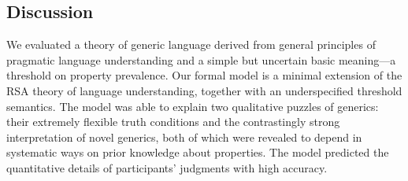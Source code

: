 \documentclass{pnastwo}
\begin{document}
\begin{article}
\section{Discussion}

We evaluated a theory of generic language derived from general principles of pragmatic language understanding and a simple but uncertain basic meaning---a threshold on property prevalence.
Our formal model is a minimal extension of the RSA theory of language understanding, together with an underspecified threshold semantics.
The model was able to explain two qualitative puzzles of generics: their extremely flexible truth conditions and the contrastingly strong interpretation of novel generics, both of which were revealed to depend in systematic ways on prior knowledge about properties. The model predicted the quantitative details of participants' judgments with high accuracy.






\end{article}
\end{document}
